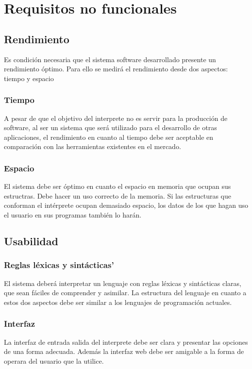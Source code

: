 \section{Requisitos no funcionales}
\subsection{Rendimiento}
Es condición necesaria que el sistema software desarrollado presente un rendimiento óptimo. Para ello se medirá el rendimiento 
desde dos aspectos: tiempo y espacio
\subsubsection{Tiempo}
A pesar de que el objetivo del interprete no es servir para la producción de software, al ser un sistema que será utilizado para el 
desarrollo de otras aplicaciones, el rendimiento en cuanto al tiempo debe ser aceptable en comparación con las herramientas existentes en 
el mercado. 

\subsubsection{Espacio}
El sistema debe ser óptimo en cuanto el espacio en memoria que ocupan sus estructras. Debe hacer un uso correcto de la memoria. 
Si las estructuras que conforman el intérprete ocupan demasiado espacio, los datos de los que hagan uso el usuario en sus programas también lo
harán.

\subsection{Usabilidad}
\subsubsection{Reglas léxicas y sintácticas'}
El sistema deberá interpretar un lenguaje con reglas léxicas y sintácticas claras, que sean fáciles de comprender y asimilar. La estructura del 
lenguaje en cuanto a estos dos aspectos debe ser similar a los lenguajes de programación actuales. 
\subsubsection{Interfaz}
La interfaz de entrada salida del interprete debe ser clara y presentar las opciones de una forma adecuada. Además la interfaz web debe 
ser amigable a la forma de operara del usuario que la utilice.


